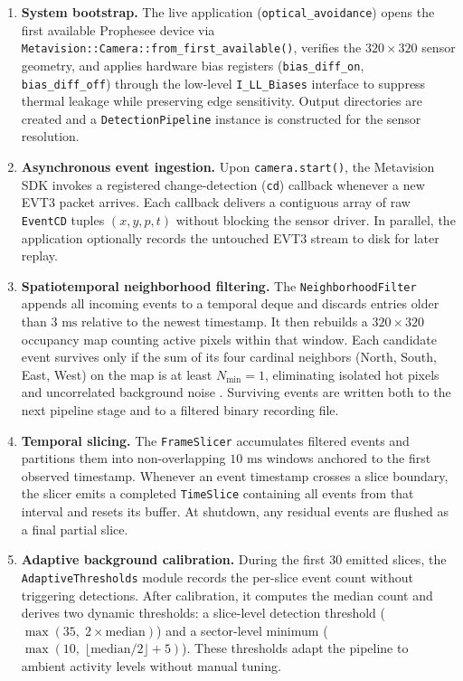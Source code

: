 \documentclass[conference]{IEEEtran}
\begin{document}
\begin{enumerate}
    \item \textbf{System bootstrap.} The live application (\texttt{optical\_avoidance}) opens the first available Prophesee device via \texttt{Metavision::Camera::from\_first\_available()}, verifies the $320 \times 320$ sensor geometry, and applies hardware bias registers (\texttt{bias\_diff\_on}, \texttt{bias\_diff\_off}) through the low-level \texttt{I\_LL\_Biases} interface to suppress thermal leakage while preserving edge sensitivity. Output directories are created and a \texttt{DetectionPipeline} instance is constructed for the sensor resolution.

    \item \textbf{Asynchronous event ingestion.} Upon \texttt{camera.start()}, the Metavision SDK invokes a registered change-detection (\texttt{cd}) callback whenever a new EVT3 packet arrives. Each callback delivers a contiguous array of raw \texttt{EventCD} tuples $(x, y, p, t)$ without blocking the sensor driver. In parallel, the application optionally records the untouched EVT3 stream to disk for later replay.

    \item \textbf{Spatiotemporal neighborhood filtering.} The \texttt{NeighborhoodFilter} appends all incoming events to a temporal deque and discards entries older than $3\text{ ms}$ relative to the newest timestamp. It then rebuilds a $320 \times 320$ occupancy map counting active pixels within that window. Each candidate event survives only if the sum of its four cardinal neighbors (North, South, East, West) on the map is at least $N_{\min} = 1$, eliminating isolated hot pixels and uncorrelated background noise \cite{b15}. Surviving events are written both to the next pipeline stage and to a filtered binary recording file.

    \item \textbf{Temporal slicing.} The \texttt{FrameSlicer} accumulates filtered events and partitions them into non-overlapping $10\text{ ms}$ windows anchored to the first observed timestamp. Whenever an event timestamp crosses a slice boundary, the slicer emits a completed \texttt{TimeSlice} containing all events from that interval and resets its buffer. At shutdown, any residual events are flushed as a final partial slice.

    \item \textbf{Adaptive background calibration.} During the first $30$ emitted slices, the \texttt{AdaptiveThresholds} module records the per-slice event count without triggering detections. After calibration, it computes the median count and derives two dynamic thresholds: a slice-level detection threshold ($\max(35,\; 2 \times \text{median})$) and a sector-level minimum ($\max(10,\; \lfloor\text{median}/2\rfloor + 5)$). These thresholds adapt the pipeline to ambient activity levels without manual tuning.


\end{enumerate}
\end{document}
